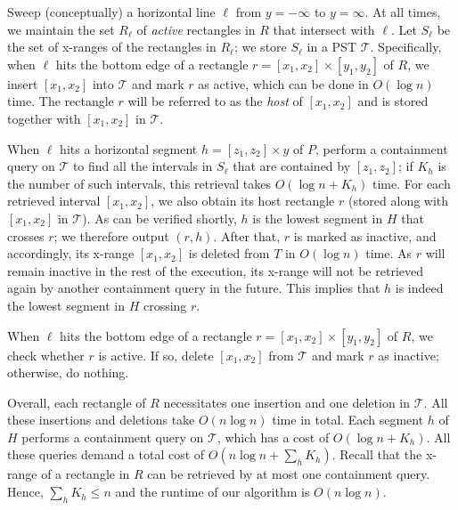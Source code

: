 \documentclass[sigconf]{acmart}
\def\vgap{\vspace{0mm}}
\def\T{\mathcal{T}}
\begin{document}
{{{%

\vgap

Sweep (conceptually) a horizontal line $\ell$ from $y = -\infty$ to $y = \infty$. At all times, we maintain the set $R_\ell$ of {\em active} rectangles in $R$ that intersect with $\ell$. Let $S_\ell$ be the set of x-ranges of the rectangles in $R_\ell$; we store $S_\ell$ in a PST $\T$. Specifically, when $\ell$ hits the bottom edge of a rectangle $r = [x_1, x_2] \times [y_1, y_2]$ of $R$, we insert $[x_1, x_2]$ into $\T$ and mark $r$ as active, which can be done in $O(\log n)$ time. The rectangle $r$ will be referred to as the {\em host} of $[x_1, x_2]$ and is stored together with $[x_1, x_2]$ in $\T$.

\vgap

When $\ell$ hits a horizontal segment $h = [z_1, z_2] \times y$ of $P$, perform a containment query on $\T$ to find all the intervals in $S_\ell$ that are contained by $[z_1, z_2]$; if $K_h$ is the number of such intervals, this retrieval takes $O(\log n + K_h)$ time. For each retrieved interval $[x_1, x_2]$, we also obtain its host rectangle $r$ (stored along with $[x_1, x_2]$ in $\T$). As can be verified shortly, $h$ is the lowest segment in $H$ that crosses $r$; we therefore output $(r, h)$. After that, $r$ is marked as inactive, and accordingly, its x-range $[x_1, x_2]$ is deleted from $T$ in $O(\log n)$ time. As $r$ will remain inactive in the rest of the execution, its x-range will not be retrieved again by another containment query in the future. This implies that $h$ is indeed the lowest segment in $H$ crossing $r$.

\vgap

When $\ell$ hits the bottom edge of a rectangle $r = [x_1, x_2] \times [y_1, y_2]$ of $R$, we check whether $r$ is active. If so, delete $[x_1, x_2]$ from $\T$ and mark $r$ as inactive; otherwise, do nothing.

\vgap

Overall, each rectangle of $R$ necessitates one insertion and one deletion in $\T$. All these insertions and deletions take $O(n \log n)$ time in total. Each segment $h$ of $H$ performs a containment query on $\T$, which has a cost of $O(\log n + K_h)$. All these queries demand a total cost of $O(n \log n + \sum_h K_h)$. Recall that the x-range of a rectangle in $R$ can be retrieved by at most one containment query. Hence, $\sum_h K_h \le n$ and the runtime of our algorithm is $O(n \log n)$.

}}}
\end{document}
